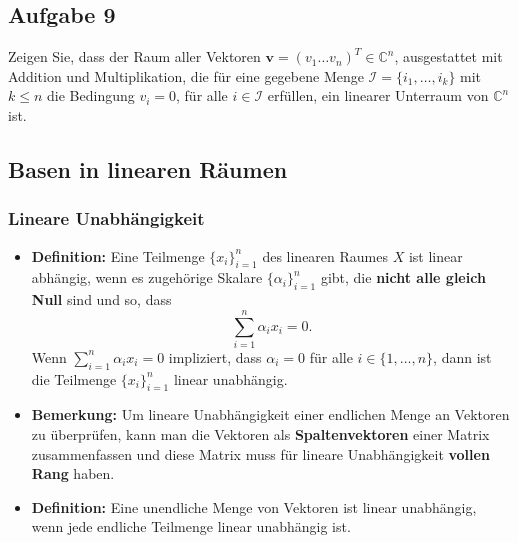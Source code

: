 \documentclass[11pt]{article}
\begin{document}
\vspace*{-0.5cm}
\subsection*{Aufgabe 9}
\vspace*{-0.5cm}
Zeigen Sie, dass der Raum aller Vektoren $\mathbf{v} = (v_1 \dots v_n)^T \in \mathbb{C}^n$, ausgestattet mit Addition und Multiplikation, die für eine gegebene Menge $\mathcal{I} = \{ i_1, \dots, i_k\}$ mit $k\leq n$ die Bedingung $v_i = 0$, für alle $i\in \mathcal{I}$ erfüllen, ein linearer Unterraum von $\mathbb{C}^n$ ist.


\vspace*{-0.5cm}
\subsection*{Basen in linearen Räumen}
\vspace*{-0.5cm}
\subsubsection*{Lineare Unabhängigkeit}
\vspace*{-0.5cm}
\begin{itemize}[leftmargin = 0pt]
    \item[] \textbf{Definition:} Eine Teilmenge $\{ x_i\}_{i=1}^n$ des linearen Raumes $X$ ist linear abhängig, wenn es zugehörige Skalare $\{\alpha_i\}_{i=1}^n$ gibt, die \textbf{nicht alle gleich Null} sind und so, dass $$\sum_{i=1}^n \alpha_i x_i = 0.$$ Wenn $\sum_{i=1}^n \alpha_i x_i = 0$ impliziert, dass $\alpha_i = 0$ für alle $i \in \{ 1, \dots, n\}$, dann ist die Teilmenge $\{ x_i\}_{i=1}^n$ linear unabhängig.
    \item[] \textbf{Bemerkung:} Um lineare Unabhängigkeit einer endlichen Menge an Vektoren zu überprüfen, kann man die Vektoren als \textbf{Spaltenvektoren} einer Matrix zusammenfassen und diese Matrix muss für lineare Unabhängigkeit \textbf{vollen Rang} haben.
    \item[] \textbf{Definition:} Eine unendliche Menge von Vektoren ist linear unabhängig, wenn jede endliche Teilmenge linear unabhängig ist.
\end{itemize}
\end{document}
